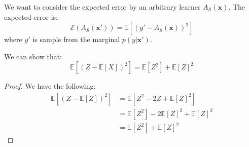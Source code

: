 \begin{remark} 
    We want to consider the expected error by an arbitrary learner $A_\mathcal{S}(\boldsymbol x)$. The expected error is:
    \begin{equation*}
        \mathcal{E}(A_\mathcal{S}(\boldsymbol x')) = \mathbb{E}[(y' - A_\mathcal{S}(\boldsymbol x))^2]
    \end{equation*}
    where $y'$ is sample from the marginal $p(y | \boldsymbol x')$.
\end{remark}

\begin{lemma}
    We can show that:
    \begin{equation*}
        \mathbb{E}[(Z - \mathbb{E}[X])^2] = \mathbb{E}[Z^2] + \mathbb{E}[Z]^2
    \end{equation*}
\end{lemma}
\begin{proof}
    We have the following:
    \begin{equation*}
    \begin{aligned}
        \mathbb{E}[(Z - \mathbb{E}[Z])^2] &= \mathbb{E}[Z^2 - 2Z + \mathbb{E}[Z]^2] \\
        &= \mathbb{E}[Z^2] - 2 \mathbb{E}[Z]^2 + \mathbb{E}[Z]^2 \\
        &= \mathbb{E}[Z^2] + \mathbb{E}[Z]^2
    \end{aligned}
    \end{equation*}
\end{proof}

